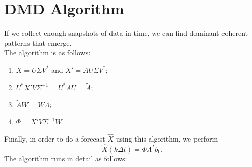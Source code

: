 \documentclass[]{article}
\begin{document}
\section{DMD Algorithm}
If we collect enough snapshots of data in time, we can find dominant coherent patterns that emerge. \\
The algorithm is as follows:
\begin{enumerate}
	\item $X=U\Sigma V^*$ and $X'=AU\Sigma V^*$;
	\item $U^*X'V\Sigma^{-1}=U^*AU=\tilde{A}$;
	\item $\tilde{A}W=W\Lambda$;
	\item $\Phi = X'V\Sigma^{-1}W$.
\end{enumerate}
Finally, in order to do a forecast $\hat{X}$ using this algorithm, we perform
\begin{equation}
	\hat{X}(k \Delta t) = \Phi \Lambda^T b_0.
\end{equation}
The algorithm runs in detail as follows:
\end{document}
